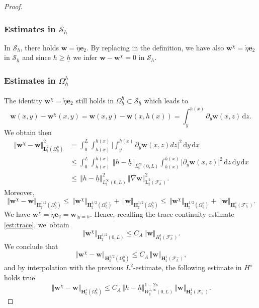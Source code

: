 \documentclass[10pt]{amsart}
\let\mathcal\mathscr
\theoremstyle{remark}
\theoremstyle{definition}
\newcommand{\norme}[1]{\,\Vert #1\Vert}
\newcommand{\dd}{\,\mathrm{d}}
\newcommand{\wg}{\boldsymbol{w}}
\newcommand{\BS}[1]{\boldsymbol{#1}}
\newcommand{\etap}{\dot{\eta}}
\newcommand{\hb}{{\underline{h}}}
\begin{document}
\begin{proof}
\subsubsection*{Estimates in $\mathcal{S}_{h}$}
In $\mathcal{S}_{h}$, there holds $\wg=\etap \BS{e}_2$. By replacing in the definition, we have also $\wg^\chi = \etap\BS{e}_2$ in $\mathcal{S}_{\hb}$ and since $h\geq \hb$ we infer $\wg - \wg^{\chi} = 0$ in $\mathcal{S}_{h}$.

\subsubsection*{Estimates in $\Omega^{h}_{\hb}$}
The identity $\wg^\chi=\etap\BS{e}_{2}$ still holds in $\Omega^{h}_{\hb} \subset \mathcal S_{\hb}$ which leads to
\[\wg(x,y)- \wg^{\chi}(x,y) = \wg(x,y) - \wg(x,h(x)) =\int_{y}^{h(x)}\partial_y\wg(x,z)\dd z.\]
We obtain then
\[
\begin{aligned}
\norme{\wg^\chi - \wg}_{\BS{L}^{2}_{\sharp}(\Omega_{\hb}^{h})}^{2}&{}=\int_{0}^{L}\int_{\hb(x)}^{h(x)}\biggl\vert \int_{y}^{h(x)}\partial_y\wg(x,z)dz\biggl\vert^{2}\dd y\dd x\\
&\leq \int_{0}^{L}\int_{\hb(x)}^{h(x)}\norme{h-\hb}_{L^{\infty}_{\sharp}(0,L)}\int_{\hb(x)}^{h(x)}\vert\partial_y\wg(x,z)\vert^{2}\dd z\dd y\dd x\\
&\leq \norme{h-\hb}_{L^{\infty}_{\sharp}(0,L)}^{2}\norme{\nabla\wg}_{\BS{L}^{2}_{\sharp}(\mathcal{F}^{-}_{h})}^{2}.
\end{aligned}
\]
Moreover,
\[\norme{\wg^\chi-\wg}_{\BS{H}^{1/2}_{\sharp}(\Omega_{\hb}^{h})}\leq \norme{\wg^\chi}_{\BS{H}^{1/2}_{\sharp}(\Omega_{\hb}^{h})} + \norme{\wg}_{\BS{H}^{1/2}_{\sharp}(\Omega_{\hb}^{h})}\leq \norme{\wg^\chi}_{\BS{H}^{1/2}_{\sharp}(\Omega_{\hb}^{h})} + \norme{\wg}_{\BS{H}^{1}_{\sharp}(\mathcal{F}^{-}_{h})}.
\]
We have
$\wg^\chi=\etap\BS{e}_2=\wg_{|{y=h}}$. Hence,
recalling the trace continuity estimate \eqref{est:trace}, we~obtain
\[
\norme{\wg^\chi}_{\BS{H}^{1/2}_{\sharp}(0,L)} \leq C_A\norme{\wg}_{H^{1}_{\sharp}(\mathcal{F}^{-}_{h})}.
\]
We conclude that
\[\norme{\wg^\chi-\wg}_{\BS{H}^{1/2}_{\sharp}(\Omega_{\hb}^{h})}\leq C_A\norme{\wg}_{\BS{H}^{1}_{\sharp}(\mathcal{F}^{-}_{h})},\]
and by interpolation with the previous $L^2$-estimate, the following estimate in $H^s$ holds true
\begin{equation} \label{eq_enhaut}
\norme{\wg^\chi-\wg}_{\BS{H}^{s}_{\sharp}(\Omega^{h}_{\hb})}\leq C_A\norme{h-\hb}_{W^{1,\infty}_{\sharp}(0,L)}^{1-2s}\norme{\wg}_{\BS{H}^{1}_{\sharp}(\mathcal{F}^{-}_{h})}.
\end{equation}


\end{proof}
\end{document}
